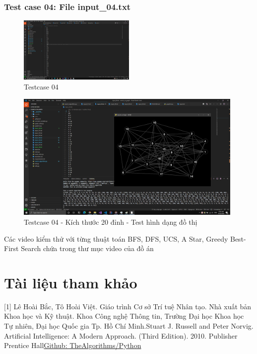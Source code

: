 \documentclass{article}
\begin{document}
\subsubsection{Test case 04: File input\_04.txt}
\begin{figure}[H]
\centering
\includegraphics[width=0.5\textwidth]{Test_Case_04.png}
\caption{Testcase 04}
\end{figure}
\begin{figure}[H]
\centering
\includegraphics[width=0.98\textwidth]{Test_Case_04_Content.png}
\caption{Testcase 04 - Kích thước 20 đỉnh - Test hình dạng đồ thị}
\end{figure}

Các video kiểm thử với từng thuật toán BFS, DFS, UCS, A Star, Greedy Best-First Search chứa trong thư mục video của đồ án

\newpage

\section{Tài liệu tham khảo}
[1] Lê Hoài Bắc, Tô Hoài Việt. Giáo trình Cơ sở Trí tuệ Nhân tạo. Nhà xuất bản Khoa học và Kỹ thuật. Khoa Công nghệ Thông tin, Trường Đại học Khoa học Tự nhiên, Đại học Quốc gia Tp. Hồ Chí Minh.\newline
[2] Stuart J. Russell and Peter Norvig. Artificial Intelligence: A Modern Approach. (Third Edition). 2010. Publisher Prentice Hall\newline
[3] \href{https://github.com/TheAlgorithms/Python}{Github: TheAlgorithms/Python}
\newpage
\end{document}
